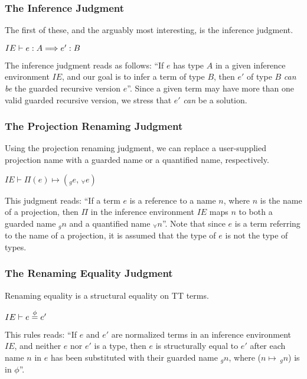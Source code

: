 \subsubsection{The Inference Judgment}
The first of these, and the arguably most interesting, is the inference judgment.

\begin{center}
  ${IE\vdash e : A \Longrightarrow e' : B}$
\end{center}

The inference judgment reads as follows: ``If $e$ has type $A$ in a given
inference environment $IE$, and our goal is to infer a term of type $B$, then
$e'$ of type $B$ \emph{can be} the guarded recursive version $e$''. Since a
given term may have more than one valid guarded recursive version, we stress
that $e'$ \emph{can} be a solution. 

\subsubsection{The Projection Renaming Judgment}
Using the projection renaming judgment, we can replace a user-supplied
projection name with a guarded name or a quantified name, respectively.
\begin{center}
  ${IE\vdash \Pi(e) \mapsto (_ge,\,_{\forall}e)}$
\end{center}
This judgment reads: ``If a term $e$ is a
reference to a name $n$, where $n$ is the name of a projection, then $\Pi$ in the inference environment $IE$ maps $n$
to both a guarded name $_gn$ and a quantified name $_{\forall}n$''. Note that since $e$ is a term referring
to the name of a projection, it is assumed that the type of $e$ is not the
type of types.

\subsubsection{The Renaming Equality Judgment}
Renaming equality is a structural equality on TT terms.
\begin{center}
  ${IE\vdash e \overset{\phi}{=} e'}$
\end{center}
This rules reads: ``If $e$ and $e'$ are normalized terms in an inference
environment $IE$, and neither $e$ nor $e'$ is a type,
then $e$ is structurally equal to $e'$ after each name $n$ in
$e$ has been substituted with their guarded name $_gn$, where ($n\mapsto\,_gn$) is in $\phi$''.

